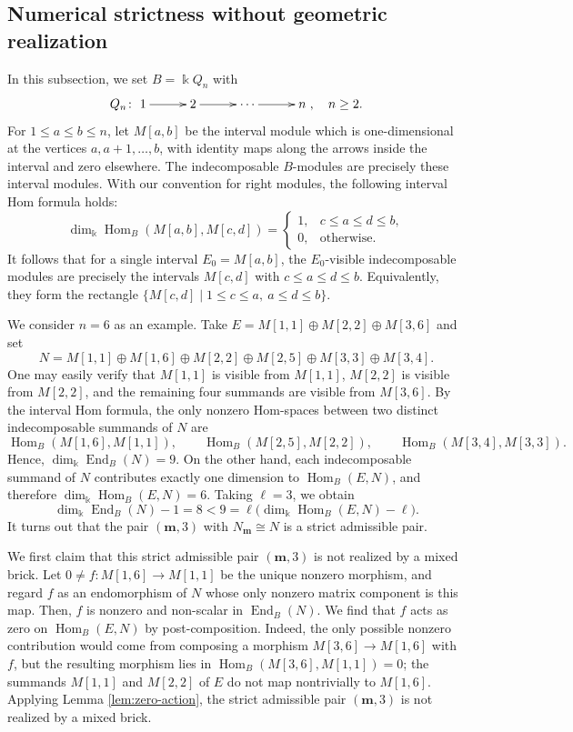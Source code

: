 \documentclass[a4,12pt]{amsart}
\numberwithin{equation}{section} %
\def\Hom{\operatorname{Hom}} %
\def\End{\operatorname{End}} %
\theoremstyle{definition} %
\begin{document}
\subsection{Numerical strictness without geometric realization}\label{subsec-example}
In this subsection, we set $B=\Bbbk Q_n$ with 
\[
Q_n\colon \xymatrix@C=1cm{1\ar[r]&2\ar[r]&\cdots \ar[r]&n}, \quad n\geq 2.
\]
For $1\leq a\leq b\leq n$, let $M[a,b]$ be the interval module which is one-dimensional at the vertices $a,a+1,\ldots,b$, with identity maps along the arrows inside the interval and zero elsewhere. The indecomposable $B$-modules are precisely these interval modules. With our convention for right modules, the following interval Hom formula holds:
\[
\dim_{\Bbbk}\Hom_B(M[a,b],M[c,d])=
\begin{cases}
1, & c\leq a\leq d\leq b,\\
0, & \text{otherwise.}
\end{cases}
\]
It follows that for a single interval $E_0=M[a,b]$, the $E_0$-visible indecomposable modules are precisely the intervals $M[c,d]$ with $c\leq a\leq d\leq b$. Equivalently, they form the rectangle
$\{M[c,d]\mid 1\leq c\leq a,\ a\leq d\leq b\}$.

We consider $n=6$ as an example. Take $E=M[1,1]\oplus M[2,2]\oplus M[3,6]$ and set 
\[ 
N= M[1,1]\oplus M[1,6]\oplus M[2,2]\oplus M[2,5]\oplus M[3,3]\oplus M[3,4]. 
\] 
One may easily verify that $M[1,1]$ is visible from $M[1,1]$, $M[2,2]$ is visible from $M[2,2]$, and the remaining four summands are visible from $M[3,6]$. By the interval Hom formula, the only nonzero Hom-spaces between two distinct indecomposable summands of $N$ are 
\[ 
\Hom_B(M[1,6],M[1,1]),\qquad \Hom_B(M[2,5],M[2,2]),\qquad \Hom_B(M[3,4],M[3,3]). 
\] 
Hence, $\dim_{\Bbbk}\End_B(N)=9$. On the other hand, each indecomposable summand of $N$ contributes exactly one dimension to $\Hom_B(E,N)$, and therefore $\dim_{\Bbbk}\Hom_B(E,N)=6$. Taking $\ell=3$, we obtain 
\[ 
\dim_{\Bbbk}\End_B(N)-1=8<9=\ell\bigl(\dim_{\Bbbk}\Hom_B(E,N)-\ell\bigr). 
\] 
It turns out that the pair $(\mathbf{m},3)$ with $N_{\mathbf{m}}\cong N$ is a strict admissible pair. 

We first claim that this strict admissible pair $(\mathbf{m},3)$ is not realized by a mixed brick. Let $0\neq f\colon M[1,6]\to M[1,1]$ be the unique nonzero morphism, and regard $f$ as an endomorphism of $N$ whose only nonzero matrix component is this map. Then, $f$ is nonzero and non-scalar in $\End_B(N)$. We find that $f$ acts as zero on $\Hom_B(E,N)$ by post-composition. Indeed, the only possible nonzero contribution would come from composing a morphism $M[3,6]\to M[1,6]$ with $f$, but the resulting morphism lies in $\Hom_B(M[3,6],M[1,1])=0$; the summands $M[1,1]$ and $M[2,2]$ of $E$ do not map nontrivially to $M[1,6]$. Applying Lemma \ref{lem:zero-action}, the strict admissible pair $(\mathbf{m},3)$ is not realized by a mixed brick. 
\end{document}
